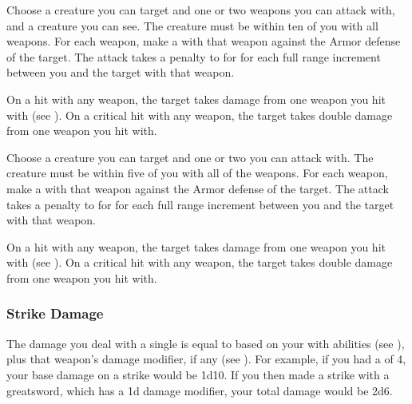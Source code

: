         \begin{freeability}{}
            Choose a creature you can target and one or two  weapons you can attack with, and a creature you can see.
            The creature must be within ten  of you with all weapons.
            For each weapon, make a  with that weapon against the Armor defense of the target.
            The attack takes a  penalty to  for for each full range increment between you and the target with that weapon.

            On a hit with any weapon, the target takes damage from one weapon you hit with (see ).
            On a critical hit with any weapon, the target takes double damage from one weapon you hit with.
        \end{freeability}

        \begin{freeability}{}
            Choose a creature you can target and one or two  you can attack with.
            The creature must be within five  of you with all of the weapons.
            For each weapon, make a  with that weapon against the Armor defense of the target.
            The attack takes a  penalty to  for for each full range increment between you and the target with that weapon.

            On a hit with any weapon, the target takes damage from one weapon you hit with (see ).
            On a critical hit with any weapon, the target takes double damage from one weapon you hit with.
        \end{freeability}

        \subsubsection{Strike Damage}\label{Strike Damage}
            The damage you deal with a single  is equal to  based on your  with  abilities (see ), plus that weapon's damage modifier, if any (see ).
            For example, if you had a  of 4, your base damage on a strike would be 1d10.
            If you then made a strike with a greatsword, which has a \plus1d damage modifier, your total damage would be 2d6.

